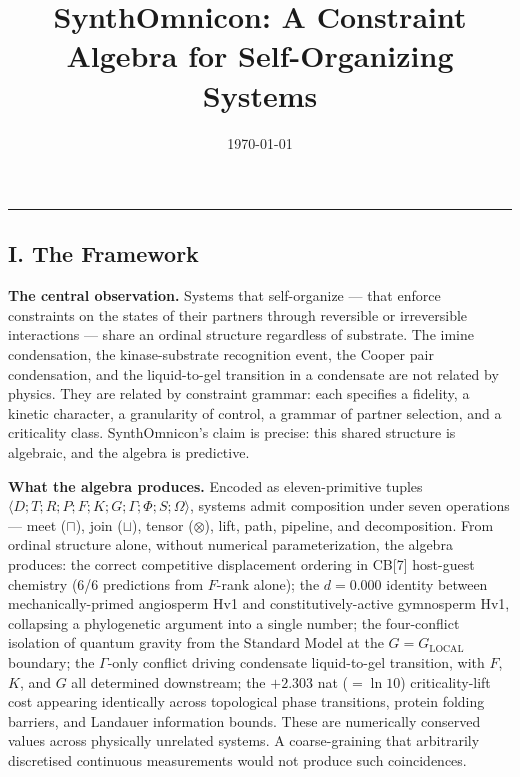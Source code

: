 \documentclass[12pt,a4paper]{article}
\begin{document}
\title{SynthOmnicon: A Constraint Algebra for Self-Organizing Systems}
\date{\today}

\maketitle

\begin{center}
\rule{0.5\textwidth}{0.4pt}
\end{center}

\subsection{I. The Framework}

\textbf{The central observation.} Systems that self-organize --- that enforce constraints on the states of their partners through reversible or irreversible interactions --- share an ordinal structure regardless of substrate. The imine condensation, the kinase-substrate recognition event, the Cooper pair condensation, and the liquid-to-gel transition in a condensate are not related by physics. They are related by constraint grammar: each specifies a fidelity, a kinetic character, a granularity of control, a grammar of partner selection, and a criticality class. SynthOmnicon's claim is precise: this shared structure is algebraic, and the algebra is predictive.

\textbf{What the algebra produces.} Encoded as eleven-primitive tuples $\langle D; T; R; P; F; K; G; \Gamma; \Phi; S; \Omega \rangle$, systems admit composition under seven operations --- meet ($\sqcap$), join ($\sqcup$), tensor ($\otimes$), lift, path, pipeline, and decomposition. From ordinal structure alone, without numerical parameterization, the algebra produces: the correct competitive displacement ordering in CB{[}7{]} host-guest chemistry (6/6 predictions from $F$-rank alone); the $d = 0.000$ identity between mechanically-primed angiosperm Hv1 and constitutively-active gymnosperm Hv1, collapsing a phylogenetic argument into a single number; the four-conflict isolation of quantum gravity from the Standard Model at the $G = G_{\text{LOCAL}}$ boundary; the $\Gamma$-only conflict driving condensate liquid-to-gel transition, with $F$, $K$, and $G$ all determined downstream; the $+2.303$ nat ($= \ln 10$) criticality-lift cost appearing identically across topological phase transitions, protein folding barriers, and Landauer information bounds. These are numerically conserved values across physically unrelated systems. A coarse-graining that arbitrarily discretised continuous measurements would not produce such coincidences.
\end{document}
